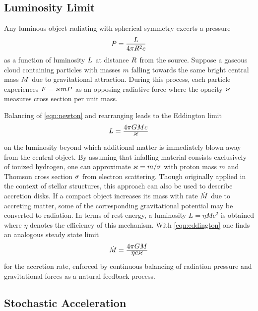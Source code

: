\subsection*{Luminosity Limit}

Any luminous object radiating with spherical symmetry excerts a pressure
\begin{equation*}
	P = \frac{\raisebox{-0.3ex}{$L$}}{4\pi R^2 c}
\end{equation*}
as a function of luminosity $L \kern+0.5pt$ at distance $R \kern+0.5pt$ from the source.
Suppose a gaseous cloud containing particles with masses $m$ falling towards the same bright central mass $M \kern+0.5pt$
due to gravitational attraction. During this process, each particle experiences $F = \kern-0.3pt \varkappa \kern+0.7pt mP \kern+0.5pt$
as an opposing radiative force where the opacity $\kern-0.3pt \varkappa \kern+0.7pt$ measures cross section per unit mass.

\newpage Balancing of \eqref{eqn:newton} and rearranging leads to the Eddington limit
\begin{equation}
	L = \frac{\raisebox{-0.3ex}{$4\pi GM c \kern+0.4pt$}}{\raisebox{0.8ex}{$\varkappa$}}
	\label{eqn:eddington}
\end{equation}
on the luminosity beyond which additional matter is immediately blown away from the central object. By assuming that infalling
material consists exclusively of ionized hydrogen, one can approximate $\varkappa \kern-0.1pt = m / \kern-0.5pt \sigma \kern+0.3pt$
with proton mass $m$ and Thomson cross section $\sigma \kern+0.5pt$ from electron scattering. Though originally applied in the
context of stellar structures, this approach can also be used to describe accretion disks. If a compact object increases its mass
with rate $\dot{M} \kern+0.5pt$ due to accreting matter, some of the corresponding gravitational potential may be converted to
radiation. In terms of rest energy, a luminosity $L = \eta\dot{M}c^2$ is obtained where $\eta$ denotes the efficiency of this
mechanism. With \eqref{eqn:eddington} one finds an analogous steady state limit
\begin{equation*}
	\dot{M} \kern-0.2pt = \frac{\raisebox{-0.3ex}{$4\pi GM$}}{\raisebox{0.8ex}{$\eta c \varkappa$}}
\end{equation*}
for the accretion rate, enforced by continuous balancing of radiation pressure and gravitational forces as a natural feedback process.



\subsection{Stochastic Acceleration}
\label{sub:acceleration}

